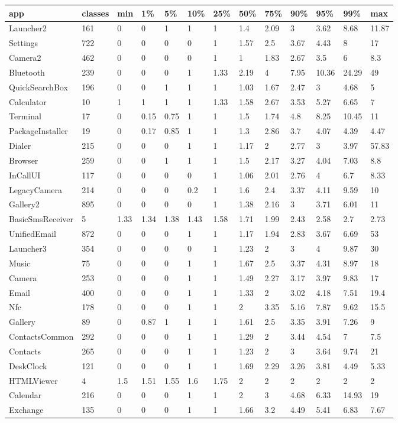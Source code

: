 \begin{tabular}{|l|l|l|l|l|l|l|l|l|l|l|l|l|}
\hline
app&classes&min&1\%&5\%&10\%&25\%&50\%&75\%&90\%&95\%&99\%&max\\
\hline
Launcher2&161&0&0&1&1&1&1.4&2.09&3&3.62&8.68&11.87\\
\hline
Settings&722&0&0&0&0&1&1.57&2.5&3.67&4.43&8&17\\
\hline
Camera2&462&0&0&0&0&1&1&1.83&2.67&3.5&6&8.3\\
\hline
Bluetooth&239&0&0&0&1&1.33&2.19&4&7.95&10.36&24.29&49\\
\hline
QuickSearchBox&196&0&0&1&1&1&1.03&1.67&2.47&3&4.68&5\\
\hline
Calculator&10&1&1&1&1&1.33&1.58&2.67&3.53&5.27&6.65&7\\
\hline
Terminal&17&0&0.15&0.75&1&1&1.5&1.74&4.8&8.25&10.45&11\\
\hline
PackageInstaller&19&0&0.17&0.85&1&1&1.3&2.86&3.7&4.07&4.39&4.47\\
\hline
Dialer&215&0&0&0&1&1&1.17&2&2.77&3&3.97&57.83\\
\hline
Browser&259&0&0&1&1&1&1.5&2.17&3.27&4.04&7.03&8.8\\
\hline
InCallUI&117&0&0&0&0&1&1.06&2.01&2.76&4&6.7&8.33\\
\hline
LegacyCamera&214&0&0&0&0.2&1&1.6&2.4&3.37&4.11&9.59&10\\
\hline
Gallery2&895&0&0&0&0&1&1.38&2.16&3&3.71&6.01&11\\
\hline
BasicSmsReceiver&5&1.33&1.34&1.38&1.43&1.58&1.71&1.99&2.43&2.58&2.7&2.73\\
\hline
UnifiedEmail&872&0&0&0&1&1&1.17&1.94&2.83&3.67&6.69&53\\
\hline
Launcher3&354&0&0&0&0&1&1.23&2&3&4&9.87&30\\
\hline
Music&75&0&0&0&1&1&1.67&2.5&3.37&4.31&8.97&18\\
\hline
Camera&253&0&0&0&1&1&1.49&2.27&3.17&3.97&9.83&17\\
\hline
Email&400&0&0&0&1&1&1.33&2&3.02&4.18&7.51&19.4\\
\hline
Nfc&178&0&0&0&1&1&2&3.35&5.16&7.87&9.62&15.5\\
\hline
Gallery&89&0&0.87&1&1&1&1.61&2.5&3.35&3.91&7.26&9\\
\hline
ContactsCommon&292&0&0&0&1&1&1.29&2&3.44&4.54&7&7.5\\
\hline
Contacts&265&0&0&0&1&1&1.23&2&3&3.64&9.74&21\\
\hline
DeskClock&121&0&0&0&1&1&1.69&2.29&3.26&3.81&4.49&5.33\\
\hline
HTMLViewer&4&1.5&1.51&1.55&1.6&1.75&2&2&2&2&2&2\\
\hline
Calendar&216&0&0&0&1&1&2&3&4.68&6.33&14.93&19\\
\hline
Exchange&135&0&0&0&1&1&1.66&3.2&4.49&5.41&6.83&7.67\\
\hline
\end{tabular}
